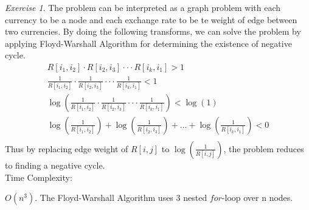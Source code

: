 \documentclass[a4paper,10pt,twoside]{article}
\theoremstyle{plain}
\theoremstyle{definition}
\theoremstyle{remark}
\newtheorem{exercise}{Exercise}
\begin{document}
\begin{exercise}
The problem can be interpreted as a graph problem with each currency to be a node and each exchange rate to be te weight of edge between two currencies. 
By doing the following transforms, we can solve the problem by applying Floyd-Warshall Algorithm for determining the existence of negative cycle.
 \[
 	\begin{aligned}
		R[i_1, i_2] \cdot R[i_2, i_3] \cdot \cdot \cdot R[i_k, i_1] > 1 \\
 		\frac{1}{R[i_1, i_2]} \cdot \frac{1}{R[i_2, i_3]} \cdot \cdot \cdot \frac{1}{R[i_k, i_1]} < 1 \\
		\log(\frac{1}{R[i_1, i_2]} \cdot \frac{1}{R[i_2, i_3]} \cdot \cdot \cdot \frac{1}{R[i_k, i_1]}) < \log(1) \\
		\log(\frac{1}{R[i_1, i_2]}) + \log(\frac{1}{R[i_2, i_3]}) + ... + \log(\frac{1}{R[i_k, i_1]}) < 0 \\
 	\end{aligned}
 \]
Thus by replacing edge weight of $R[i, j]$ to $\log(\frac{1}{R[i, j]})$, the problem reduces to finding a negative cycle.\\

Time Complexity:

$O(n^3)$. 
The Floyd-Warshall Algorithm uses 3 nested $for$-loop over n nodes.\\

\end{exercise}
\end{document}
